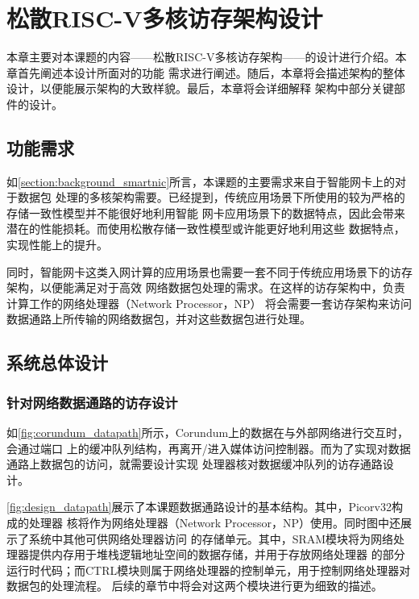 \section{松散RISC-V多核访存架构设计}

本章主要对本课题的内容——松散RISC-V多核访存架构——的设计进行介绍。本章首先阐述本设计所面对的功能
需求进行阐述。随后，本章将会描述架构的整体设计，以便能展示架构的大致样貌。最后，本章将会详细解释
架构中部分关键部件的设计。

\subsection{功能需求}
\label{section:design_need}

如\autoref{section:background_smartnic}所言，本课题的主要需求来自于智能网卡上的对于数据包
处理的多核架构需要。已经提到，传统应用场景下所使用的较为严格的存储一致性模型并不能很好地利用智能
网卡应用场景下的数据特点，因此会带来潜在的性能损耗。而使用松散存储一致性模型或许能更好地利用这些
数据特点，实现性能上的提升。

同时，智能网卡这类入网计算的应用场景也需要一套不同于传统应用场景下的访存架构，以便能满足对于高效
网络数据包处理的需求。在这样的访存架构中，负责计算工作的网络处理器（Network Processor，NP）
将会需要一套访存架构来访问数据通路上所传输的网络数据包，并对这些数据包进行处理。

\subsection{系统总体设计}
\label{section:design_overview}

\subsubsection{针对网络数据通路的访存设计}

如\autoref{fig:corundum_datapath}所示，Corundum上的数据在与外部网络进行交互时，会通过端口
上的缓冲队列结构，再离开/进入媒体访问控制器。而为了实现对数据通路上数据包的访问，就需要设计实现
处理器核对数据缓冲队列的访存通路设计。


\autoref{fig:design_datapath}展示了本课题数据通路设计的基本结构。其中，Picorv32构成的处理器
核将作为网络处理器（Network Processor，NP）使用。同时图中还展示了系统中其他可供网络处理器访问
的存储单元。其中，SRAM模块将为网络处理器提供内存用于堆栈逻辑地址空间的数据存储，并用于存放网络处理器
的部分运行时代码；而CTRL模块则属于网络处理器的控制单元，用于控制网络处理器对数据包的处理流程。
后续的章节中将会对这两个模块进行更为细致的描述。

